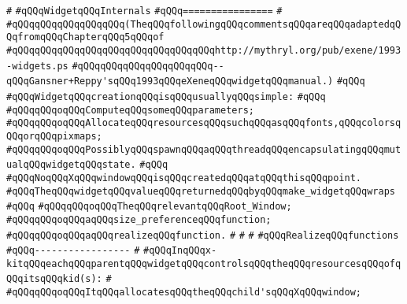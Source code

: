 \verb|#|\newline
\verb|#qQQqWidgetqQQqInternals|\newline
\verb|#qQQq================|\newline
\verb|#|\newline
\verb|#qQQqqQQqqQQqqQQqqQQq(TheqQQqfollowingqQQqcommentsqQQqareqQQqadaptedqQQqfromqQQqChapterqQQq5qQQqof|\newline
\verb|#qQQqqQQqqQQqqQQqqQQqqQQqqQQqqQQqqQQqhttp://mythryl.org/pub/exene/1993-widgets.ps|\newline
\verb|#qQQqqQQqqQQqqQQqqQQqqQQq--qQQqGansner+Reppy'sqQQq1993qQQqeXeneqQQqwidgetqQQqmanual.)|\newline
\verb|#qQQq|\newline
\verb|#qQQqWidgetqQQqcreationqQQqisqQQqusuallyqQQqsimple:|\newline
\verb|#qQQq|\newline
\verb|#qQQqqQQqoqQQqComputeqQQqsomeqQQqparameters;|\newline
\verb|#qQQqqQQqoqQQqAllocateqQQqresourcesqQQqsuchqQQqasqQQqfonts,qQQqcolorsqQQqorqQQqpixmaps;|\newline
\verb|#qQQqqQQqoqQQqPossiblyqQQqspawnqQQqaqQQqthreadqQQqencapsulatingqQQqmutualqQQqwidgetqQQqstate.|\newline
\verb|#qQQq|\newline
\verb|#qQQqNoqQQqXqQQqwindowqQQqisqQQqcreatedqQQqatqQQqthisqQQqpoint.|\newline
\verb|#qQQqTheqQQqwidgetqQQqvalueqQQqreturnedqQQqbyqQQqmake_widgetqQQqwraps|\newline
\verb|#qQQq|\newline
\verb|#qQQqqQQqoqQQqTheqQQqrelevantqQQqRoot_Window;|\newline
\verb|#qQQqqQQqoqQQqaqQQqsize_preferenceqQQqfunction;|\newline
\verb|#qQQqqQQqoqQQqaqQQqrealizeqQQqfunction.|\newline
\verb|#|\newline
\verb|#|\newline
\verb|#|\newline
\verb|#qQQqRealizeqQQqfunctions|\newline
\verb|#qQQq-----------------|\newline
\verb|#|\newline
\verb|#qQQqInqQQqx-kitqQQqeachqQQqparentqQQqwidgetqQQqcontrolsqQQqtheqQQqresourcesqQQqofqQQqitsqQQqkid(s):|\newline
\verb|#|\newline
\verb|#qQQqqQQqoqQQqItqQQqallocatesqQQqtheqQQqchild'sqQQqXqQQqwindow;|\newline
